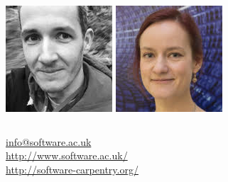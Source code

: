 \documentclass{beamer}
\begin{document}
\begin{frame}
\begin{columns}
\begin{column}{.2\textwidth}
\begin{center}
                \includegraphics[width=.8\textwidth]{img/fellows/steve-harris_thumb.jpg}
                \vspace{.2cm}
                \includegraphics[width=.8\textwidth]{img/fellows/terhi-nurmikko-fuller_thumb.jpg}
            \end{center}
        \end{column}
    \end{columns}
\end{frame}

\begin{frame}
    \begin{center}
        \url{info@software.ac.uk}\\
        \url{http://www.software.ac.uk/}\\
        \url{http://software-carpentry.org/}\\
    \end{center}
\end{frame}
\end{document}
